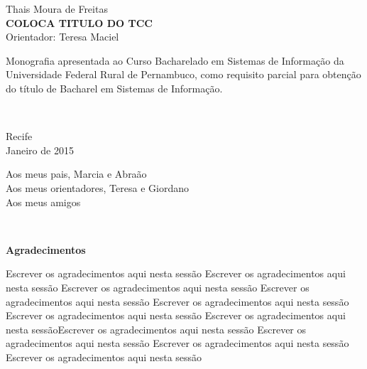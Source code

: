 %
\hyphenation{}

\vspace*{0.0cm}
{\center
{\Large Thais Moura de Freitas}\\[2.4cm]
{\huge \bf COLOCA TITULO DO TCC}\\[2.0cm]
{\Large Orientador: Teresa Maciel}}\\[2.0cm]

{\raggedleft
\begin{minipage}[t]{8.3cm}
\setlength{\baselineskip}{0.25in}
Monografia apresentada ao Curso Bacharelado em Sistemas de Informação  da Universidade Federal Rural de Pernambuco, como requisito parcial para obtenção do título de Bacharel em Sistemas de Informação.\end{minipage}\\[2cm]}
\vspace{3cm}
{\center Recife \\[3mm]
Janeiro de 2015 \\}

\newpage
\vspace*{18cm}
{\raggedleft
\begin{minipage}[t]{6.0cm}
\setlength{\baselineskip}{0.25in}
Aos meus pais, Marcia e Abraão\\
Aos meus orientadores, Teresa e Giordano\\
Aos meus amigos\\
\end{minipage}\\[2cm]}



\newpage
\begin{center}
{\Large \bf Agradecimentos}
\end{center}
\vspace*{-0.06in}

Escrever os agradecimentos aqui nesta sessão
Escrever os agradecimentos aqui nesta sessão
Escrever os agradecimentos aqui nesta sessão
Escrever os agradecimentos aqui nesta sessão
Escrever os agradecimentos aqui nesta sessão
Escrever os agradecimentos aqui nesta sessão
Escrever os agradecimentos aqui nesta sessãoEscrever os agradecimentos aqui nesta sessão
Escrever os agradecimentos aqui nesta sessão
Escrever os agradecimentos aqui nesta sessão
Escrever os agradecimentos aqui nesta sessão
